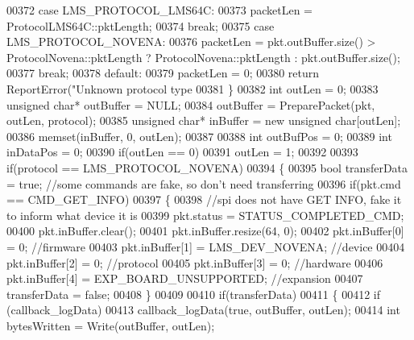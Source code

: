 \begin{DoxyCode}
00372     \textcolor{keywordflow}{case} LMS_PROTOCOL_LMS64C:
00373         packetLen = ProtocolLMS64C::pktLength;
00374         \textcolor{keywordflow}{break};
00375     \textcolor{keywordflow}{case} LMS_PROTOCOL_NOVENA:
00376         packetLen = pkt.outBuffer.size() > ProtocolNovena::pktLength ? 
      ProtocolNovena::pktLength : pkt.outBuffer.size();
00377         \textcolor{keywordflow}{break};
00378     \textcolor{keywordflow}{default}:
00379         packetLen = 0;
00380         \textcolor{keywordflow}{return} ReportError(\textcolor{stringliteral}{"Unknown protocol type %
00381     \}
00382     \textcolor{keywordtype}{int} outLen = 0;
00383     \textcolor{keywordtype}{unsigned} \textcolor{keywordtype}{char}* outBuffer = NULL;
00384     outBuffer = PreparePacket(pkt, outLen, protocol);
00385     \textcolor{keywordtype}{unsigned} \textcolor{keywordtype}{char}* inBuffer = \textcolor{keyword}{new} \textcolor{keywordtype}{unsigned} \textcolor{keywordtype}{char}[outLen];
00386     memset(inBuffer, 0, outLen);
00387 
00388     \textcolor{keywordtype}{int} outBufPos = 0;
00389     \textcolor{keywordtype}{int} inDataPos = 0;
00390     \textcolor{keywordflow}{if}(outLen == 0)
00391         outLen = 1;
00392 
00393     \textcolor{keywordflow}{if}(protocol == LMS_PROTOCOL_NOVENA)
00394     \{
00395         \textcolor{keywordtype}{bool} transferData = \textcolor{keyword}{true}; \textcolor{comment}{//some commands are fake, so don't need transferring}
00396         \textcolor{keywordflow}{if}(pkt.cmd == CMD_GET_INFO)
00397         \{
00398             \textcolor{comment}{//spi does not have GET INFO, fake it to inform what device it is}
00399             pkt.status = STATUS_COMPLETED_CMD;
00400             pkt.inBuffer.clear();
00401             pkt.inBuffer.resize(64, 0);
00402             pkt.inBuffer[0] = 0; \textcolor{comment}{//firmware}
00403             pkt.inBuffer[1] = LMS_DEV_NOVENA; \textcolor{comment}{//device}
00404             pkt.inBuffer[2] = 0; \textcolor{comment}{//protocol}
00405             pkt.inBuffer[3] = 0; \textcolor{comment}{//hardware}
00406             pkt.inBuffer[4] = EXP_BOARD_UNSUPPORTED; \textcolor{comment}{//expansion}
00407             transferData = \textcolor{keyword}{false};
00408         \}
00409 
00410         \textcolor{keywordflow}{if}(transferData)
00411         \{
00412             \textcolor{keywordflow}{if} (callback_logData)
00413                 callback_logData(\textcolor{keyword}{true}, outBuffer, outLen);
00414             \textcolor{keywordtype}{int} bytesWritten = Write(outBuffer, outLen);
}
\end{DoxyCode}
